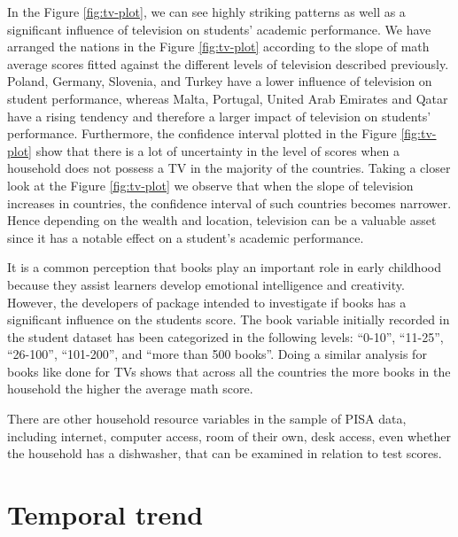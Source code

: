 In the Figure \ref{fig:tv-plot}, we can see highly striking patterns as well as a significant influence of television on students' academic performance. We have arranged the nations in the Figure \ref{fig:tv-plot} according to the slope of math average scores fitted against the different levels of television described previously. Poland, Germany, Slovenia, and Turkey have a lower influence of television on student performance, whereas Malta, Portugal, United Arab Emirates and Qatar have a rising tendency and therefore a larger impact of television on students' performance. Furthermore, the confidence interval plotted in the Figure \ref{fig:tv-plot} show that there is a lot of uncertainty in the level of scores when a household does not possess a TV in the majority of the countries. Taking a closer look at the Figure \ref{fig:tv-plot} we observe that when the slope of television increases in countries, the confidence interval of such countries becomes narrower. Hence depending on the wealth and location, television can be a valuable asset since it has a notable effect on a student's academic performance.

It is a common perception that books play an important role in early childhood because they assist learners develop emotional intelligence and creativity. However, the developers of  package intended to investigate if books has a significant influence on the students score. The book variable initially recorded in the student dataset has been categorized in the following levels: ``0-10'', ``11-25'', ``26-100'', ``101-200'', and ``more than 500 books''. Doing a similar analysis for books like done for TVs shows that across all the countries the more books in the household the higher the average math score.

There are other household resource variables in the sample of PISA data, including internet, computer access, room of their own, desk access, even whether the household has a dishwasher, that can be examined in relation to test scores.

\section{Temporal trend}\label{temporal-trend}

